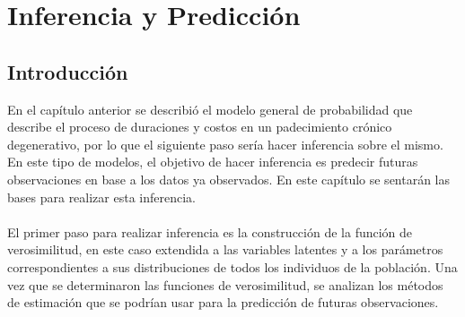 \chapter{Inferencia y Predicci\'on}
\section{Introducci\'on}
En el cap\'itulo anterior se describi\'o el modelo general de probabilidad que describe el proceso de duraciones y costos en un padecimiento cr\'onico degenerativo, por lo que el siguiente paso ser\'ia hacer inferencia sobre el mismo. En este tipo de modelos, el objetivo de hacer inferencia es predecir futuras observaciones en base a los datos ya observados. En este cap\'itulo se sentar\'an las bases para realizar esta inferencia.\\
\\
El primer paso para realizar inferencia es la construcci\'on de la funci\'on de verosimilitud, en este caso extendida a las variables latentes y a los par\'ametros correspondientes a sus distribuciones de todos los individuos de la poblaci\'on. Una vez que se determinaron las funciones de verosimilitud, se analizan los m\'etodos de estimaci\'on que se podr\'ian usar para la predicci\'on de futuras observaciones. %
